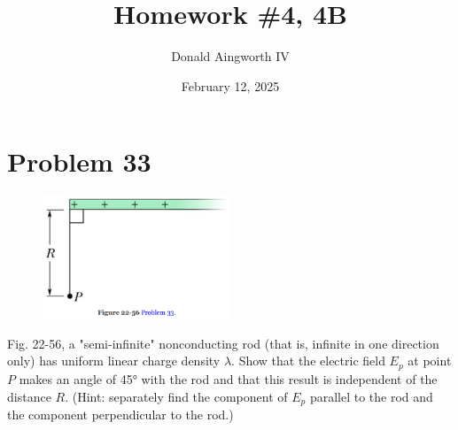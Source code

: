 \documentclass[12pt]{article}
\title{Homework \#4, 4B}
\author{Donald Aingworth IV}
\date{February 12, 2025}
\begin{document}

\maketitle

\pagebreak
\section{Problem 33}
\begin{figure}
    \vspace{-30pt}
    \includegraphics[width=0.5\textwidth]{picture_1.png} 
\end{figure}
Fig. 22-56, a "semi-infinite" nonconducting rod (that is, infinite in one direction only) has uniform linear charge density $\lambda$. Show that the electric field $E_p$ at point $P$ makes an angle of 45\unit{\degree} with the rod and that this result is independent of the distance $R$. (Hint: separately find the component of $E_p$ parallel to the rod and the component perpendicular to the rod.)
\end{document}
